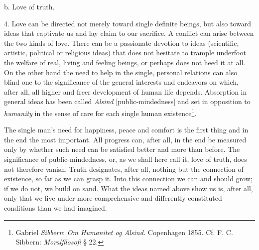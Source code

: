 \documentclass[12pt,a4paper,openany]{book}
\newcommand{\opage}[1]{\marginnote{\footnotesize\textit{[#1]}}}
\begin{document}
\begin{center}b. Love of truth.\end{center}

4. Love can be directed not merely toward single definite beings, but also toward ideas that captivate us and lay claim
to our sacrifice. A conflict can arise between the two kinds of love. There can be a passionate devotion to ideas
(scientific, artistic, political or religious ideas) that does not hesitate to trample underfoot the welfare of real,
living and feeling beings, or perhaps does not heed it at all. On the other hand the need to help in the single,
personal relations can also blind one to the significance of the general interests and endeavors on which, after all,
all higher and freer development of human life depends. Absorption in general ideas has been called
\textit{Alsind} [public-mindedness] and set
\opage{250}in opposition to \textit{humanity} in the sense of care for each single human
existence\footnote[1]{Gabriel \emph{Sibbern}: \textit{Om Humanitet og Alsind.} Copenhagen 1855. Cf. F. C. Sibbern:
\textit{Moralfilosofi} § 22.}.

The single man's need for happiness, peace and comfort is the first thing and in the end the most important. All
progress can, after all, in the end be measured only by whether such need can be satisfied better and more than before.
The significance of public-mindedness, or, as we shall here call it, love of truth, does not therefore vanish. Truth
designates, after all, nothing but the connection of existence, so far as we can grasp it. Into this connection we can
and should grow; if we do not, we build on sand. What the ideas named above show us is, after all, only that we live
under more comprehensive and differently constituted conditions than we had imagined.
\end{document}
